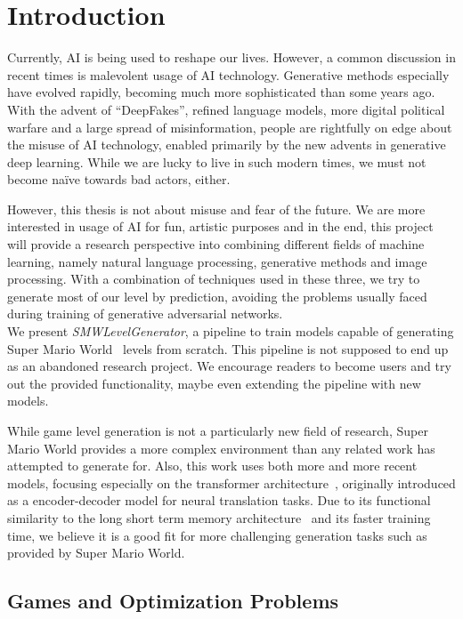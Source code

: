 \section{Introduction}

Currently, AI is being used to reshape our lives. However, a common
discussion in recent times is malevolent usage of AI technology.
Generative methods especially have evolved rapidly, becoming much more
sophisticated than some years ago. With the advent of ``DeepFakes'',
refined language models, more digital political warfare and a large
spread of misinformation, people are rightfully on edge about the
misuse of AI technology, enabled primarily by the new advents in
generative deep learning. While we are lucky to live in such modern
times, we must not become naïve towards bad actors, either.

However, this thesis is not about misuse and fear of the future. We
are more interested in usage of AI for fun, artistic purposes and in
the end, this project will provide a research perspective into
combining different fields of machine learning, namely natural
language processing, generative methods and image processing. With a
combination of techniques used in these three, we try to generate most
of our level by prediction, avoiding the problems usually faced during
training of generative adversarial networks. \\
We present \emph{SMWLevelGenerator}, a pipeline to train models
capable of generating Super Mario World~\cite{SuperMarioWorld2019}
levels from scratch. This pipeline is not supposed to end up as an
abandoned research project. We encourage readers to become users and
try out the provided functionality, maybe even extending the pipeline
with new models.

While game level generation is not a particularly new field of
research, Super Mario World provides a more complex environment than
any related work has attempted to generate for. Also, this work uses
both more and more recent models, focusing especially on the
transformer architecture~\cite{vaswaniAttentionAllYou2017}, originally
introduced as a encoder-decoder model for neural translation tasks.
Due to its functional similarity to the long short term memory
architecture~\cite{hochreiterLongShorttermMemory1997} and its faster
training time, we believe it is a good fit for more challenging
generation tasks such as provided by Super Mario World.

\subsection{Games and Optimization Problems}

